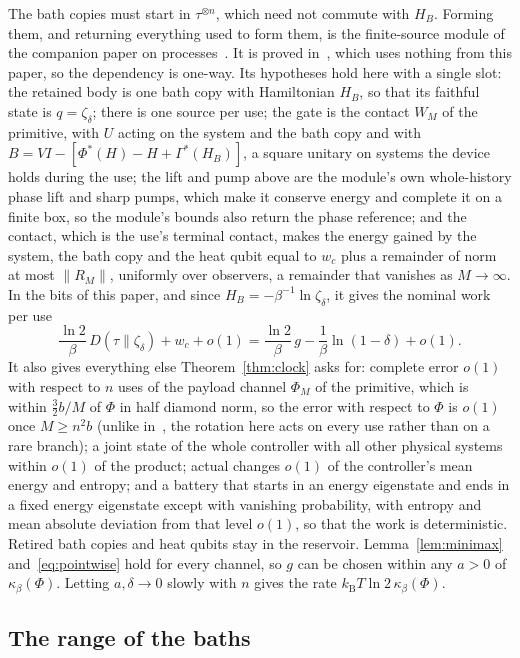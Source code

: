 \documentclass[11pt]{article}
\theoremstyle{definition}
\theoremstyle{remark}
\newcommand{\kB}{k_{\mathrm B}}
\newcommand{\Trt}{\kappa_\beta}
\begin{document}
The bath copies must start in $\tau^{\otimes n}$, which need not commute with $H_B$. Forming them, and returning everything used to form them, is the finite-source module of the companion paper on processes~\cite[Lemma~12]{Answering}. It is proved in~\cite[App.~E]{Answering}, which uses nothing from this paper, so the dependency is one-way. Its hypotheses hold here with a single slot: the retained body is one bath copy with Hamiltonian $H_B$, so that its faithful state is $q=\zeta_\delta$; there is one source per use; the gate is the contact $W_M$ of the primitive, with $U$ acting on the system and the bath copy and with $B=VI-[\Phi^*(H)-H+\Gamma^*(H_B)]$, a square unitary on systems the device holds during the use; the lift and pump above are the module's own whole-history phase lift and sharp pumps, which make it conserve energy and complete it on a finite box, so the module's bounds also return the phase reference; and the contact, which is the use's terminal contact, makes the energy gained by the system, the bath copy and the heat qubit equal to $w_c$ plus a remainder of norm at most $\|R_M\|$, uniformly over observers, a remainder that vanishes as $M\to\infty$. In the bits of this paper, and since $H_B=-\beta^{-1}\ln\zeta_\delta$, it gives the nominal work per use
\[
\frac{\ln2}{\beta}\,D(\tau\|\zeta_\delta)+w_c+o(1)=\frac{\ln2}{\beta}\,g-\frac1\beta\ln(1-\delta)+o(1).
\]
It also gives everything else Theorem~\ref{thm:clock} asks for: complete error $o(1)$ with respect to $n$ uses of the payload channel $\Phi_M$ of the primitive, which is within $\tfrac32b/M$ of $\Phi$ in half diamond norm, so the error with respect to $\Phi$ is $o(1)$ once $M\ge n^2b$ (unlike in~\cite{Answering}, the rotation here acts on every use rather than on a rare branch); a joint state of the whole controller with all other physical systems within $o(1)$ of the product; actual changes $o(1)$ of the controller's mean energy and entropy; and a battery that starts in an energy eigenstate and ends in a fixed energy eigenstate except with vanishing probability, with entropy and mean absolute deviation from that level $o(1)$, so that the work is deterministic. Retired bath copies and heat qubits stay in the reservoir. Lemma~\ref{lem:minimax} and~\eqref{eq:pointwise} hold for every channel, so $g$ can be chosen within any $a>0$ of $\Trt(\Phi)$. Letting $a,\delta\to0$ slowly with $n$ gives the rate $\kB T\ln2\,\Trt(\Phi)$.

\subsection{The range of the baths}
\end{document}
